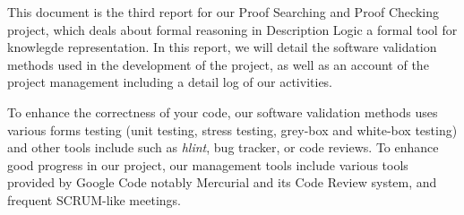 This document is the third report for our Proof Searching and Proof
Checking project, which deals about formal reasoning in Description
Logic a formal tool for knowlegde representation. In this report, we
will detail the software validation methods used in the development of
the project, as well as an account of the project management including
a detail log of our activities.

To enhance the correctness of your code, our software validation
methods uses various forms testing (unit testing, stress testing,
grey-box and white-box testing) and other tools include such
as \emph{hlint}, bug tracker, or code reviews. To enhance good
progress in our project, our management tools include various tools
provided by Google Code notably Mercurial and its Code Review
system, and frequent SCRUM-like meetings.

